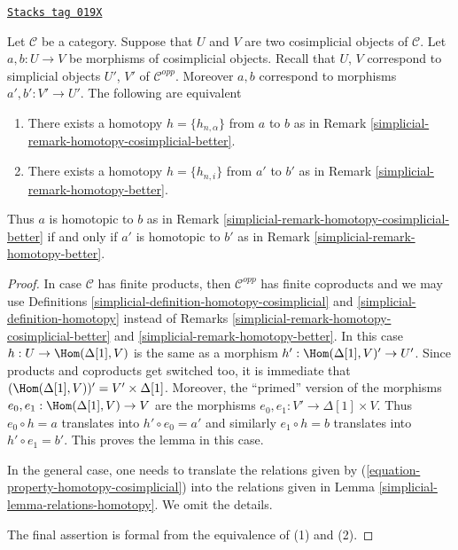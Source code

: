 \begin{lemma}
\label{simplicial-lemma-compare-homotopies}
\href{https://stacks.math.columbia.edu/tag/019X}{\texttt{Stacks tag 019X}}

Let $\mathcal{C}$ be a category. Suppose that $U$ and $V$ are two
cosimplicial objects of $\mathcal{C}$. Let $a, b : U \to V$ be morphisms
of cosimplicial objects. Recall that $U$, $V$ correspond
to simplicial objects $U'$, $V'$ of $\mathcal{C}^{opp}$.
Moreover $a, b$ correspond to morphisms $a', b' : V' \to U'$.
The following are equivalent
\begin{enumerate}
\item There exists a homotopy $h = \{h_{n, \alpha}\}$ from
$a$ to $b$ as in Remark \ref{simplicial-remark-homotopy-cosimplicial-better}.
\item There exists a homotopy $h = \{h_{n, i}\}$ from $a'$ to $b'$
as in Remark \ref{simplicial-remark-homotopy-better}.
\end{enumerate}
Thus $a$ is homotopic to $b$ as in
Remark \ref{simplicial-remark-homotopy-cosimplicial-better}
if and only if $a'$ is homotopic to $b'$ as in
Remark \ref{simplicial-remark-homotopy-better}.
\end{lemma}

\begin{proof}

In case $\mathcal{C}$ has finite products, then $\mathcal{C}^{opp}$
has finite coproducts and we may use
Definitions \ref{simplicial-definition-homotopy-cosimplicial}
and \ref{simplicial-definition-homotopy} instead of
Remarks \ref{simplicial-remark-homotopy-cosimplicial-better} and
\ref{simplicial-remark-homotopy-better}.
In this case $h : U \to \Hom(\Delta[1], V)$
is the same as a morphism $h' : \Hom(\Delta[1], V)' \to U'$.
Since products and coproducts get switched too, it is immediate
that $(\Hom(\Delta[1], V))' = V' \times \Delta[1]$.
Moreover, the ``primed'' version of the morphisms
$e_0, e_1 : \Hom(\Delta[1], V) \to V$ are the morphisms
$e_0, e_1 : V' \to \Delta[1] \times V$.
Thus $e_0 \circ h = a$ translates into $h' \circ e_0 = a'$ and
similarly $e_1 \circ h = b$ translates into $h' \circ e_1 = b'$.
This proves the lemma in this case.

\medskip\noindent
In the general case, one needs to translate the relations given
by (\ref{equation-property-homotopy-cosimplicial}) into the relations
given in Lemma \ref{simplicial-lemma-relations-homotopy}. We omit the details.

\medskip\noindent
The final assertion is formal from the equivalence of (1) and (2).
\end{proof}

